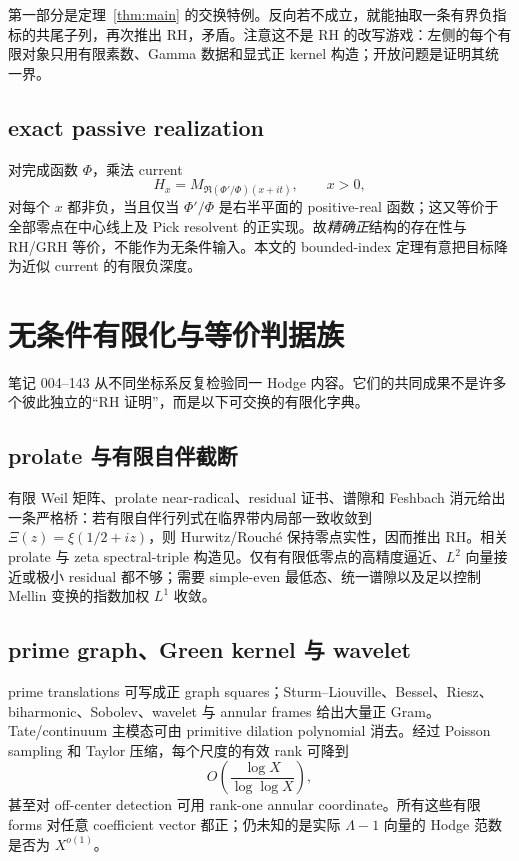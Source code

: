 \documentclass[UTF8,11pt,a4paper]{ctexart}
\theoremstyle{definition}
\theoremstyle{remark}
\newcommand{\1}{\mathbf 1}
\begin{document}
第一部分是定理~\ref{thm:main} 的交换特例。反向若不成立，就能抽取一条有界负指标的共尾子列，再次推出 RH，矛盾。注意这不是 RH 的改写游戏：左侧的每个有限对象只用有限素数、Gamma 数据和显式正 kernel 构造；开放问题是证明其统一界。

\subsection{exact passive realization}

对完成函数 $\Phi$，乘法 current
\[
  H_x=M_{\Re(\Phi'/\Phi)(x+it)},\qquad x>0,
\]
对每个 $x$ 都非负，当且仅当 $\Phi'/\Phi$ 是右半平面的 positive-real 函数；这又等价于全部零点在中心线上及 Pick resolvent 的正实现。故\emph{精确正}结构的存在性与 RH/GRH 等价，不能作为无条件输入。本文的 bounded-index 定理有意把目标降为近似 current 的有限负深度。

\section{无条件有限化与等价判据族}

笔记 004--143 从不同坐标系反复检验同一 Hodge 内容。它们的共同成果不是许多个彼此独立的“RH 证明”，而是以下可交换的有限化字典。

\subsection{prolate 与有限自伴截断}

有限 Weil 矩阵、prolate near-radical、residual 证书、谱隙和 Feshbach 消元给出一条严格桥：若有限自伴行列式在临界带内局部一致收敛到 $\Xi(z)=\xi(1/2+iz)$，则 Hurwitz/Rouch\'e 保持零点实性，因而推出 RH。相关 prolate 与 zeta spectral-triple 构造见\cite{CC2021,CCMProlate,CCM2025}。仅有有限低零点的高精度逼近、$L^2$ 向量接近或极小 residual 都不够；需要 simple-even 最低态、统一谱隙以及足以控制 Mellin 变换的指数加权 $L^1$ 收敛。

\subsection{prime graph、Green kernel 与 wavelet}

prime translations 可写成正 graph squares；Sturm--Liouville、Bessel、Riesz、biharmonic、Sobolev、wavelet 与 annular frames 给出大量正 Gram。Tate/continuum 主模态可由 primitive dilation polynomial 消去。经过 Poisson sampling 和 Taylor 压缩，每个尺度的有效 rank 可降到
\[
  O\!\left(\frac{\log X}{\log\log X}\right),
\]
甚至对 off-center detection 可用 rank-one annular coordinate。所有这些有限 forms 对任意 coefficient vector 都正；仍未知的是实际 $\Lambda-1$ 向量的 Hodge 范数是否为 $X^{o(1)}$。
\end{document}

